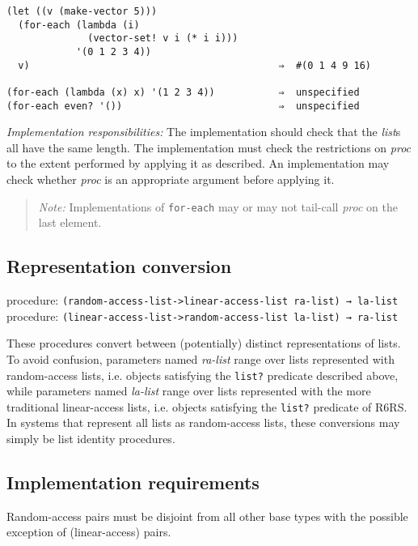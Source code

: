 \begin{verbatim}
(let ((v (make-vector 5)))
  (for-each (lambda (i)
              (vector-set! v i (* i i)))
            '(0 1 2 3 4))
  v)                                           ⇒  #(0 1 4 9 16)

(for-each (lambda (x) x) '(1 2 3 4))           ⇒  unspecified
(for-each even? '())                           ⇒  unspecified
\end{verbatim}

\emph{Implementation responsibilities:} The implementation should check
that the \emph{list}s all have the same length. The implementation must
check the restrictions on \emph{proc} to the extent performed by
applying it as described. An implementation may check whether
\emph{proc} is an appropriate argument before applying it.

\begin{quote}
\emph{Note:} Implementations of \texttt{for-each} may or may not
tail-call \emph{proc} on the last element.
\end{quote}

\subsection{{Representation conversion}}\label{representation-conversion}

procedure:
\texttt{(random-access-list-\textgreater{}linear-access-list\ ra-list)\ →\ la-list}\\
procedure:
\texttt{(linear-access-list-\textgreater{}random-access-list\ la-list)\ →\ ra-list}

These procedures convert between (potentially) distinct representations
of lists. To avoid confusion, parameters named \emph{ra-list} range over
lists represented with random-access lists, i.e. objects satisfying the
\texttt{list?} predicate described above, while parameters named
\emph{la-list} range over lists represented with the more traditional
linear-access lists, i.e. objects satisfying the \texttt{list?}
predicate of R6RS. In systems that represent all lists as random-access
lists, these conversions may simply be list identity procedures.

\subsection{{Implementation requirements}}\label{implementation-requirements}

Random-access pairs must be disjoint from all other base types with the
possible exception of (linear-access) pairs.

